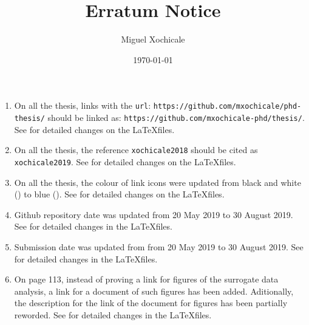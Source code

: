 \documentclass[11pt]{article}
\title{Erratum Notice}
\author{Miguel Xochicale}
\date{\today}
\newcommand{\codeicon}{{\color{linkcolor}\faFileCodeO}}
\newcommand{\codecolorlink}[1]{\href{#1}{\codeicon}}
\newcommand{\codeiconbw}{{\color{linkbw}\faFileCodeO}}
\newcommand{\codebwlink}[1]{\href{#1}{\codeiconbw}}
\begin{document}
\maketitle

\begin{enumerate}
\item On all the thesis, links with the \texttt{url}:   
\texttt{https://github.com/mxochicale/phd-thesis/}
should be linked as: \texttt{https://github.com/mxochicale-phd/thesis/}.
See \cite{xochicale2019-links} for detailed changes on the \LaTeX \space files.


\item On all the thesis, the reference \texttt{xochicale2018} should be cited as
\texttt{xochicale2019}.
See \cite{xochicale2019-links} for detailed changes on the \LaTeX \space files.


\item On all the thesis, the colour of link icons were updated from black and white 
(\texttt{\codebwlink{https://github.com/mxochicale-phd/thesis/}}) to 
blue (\texttt{\codecolorlink{https://github.com/mxochicale-phd/thesis/}}).
See \cite{xochicale2019-links} for detailed changes on the \LaTeX \space files.


\item Github repository date was updated from 20 May 2019 to 30 August 2019.
See \cite{xochicale2019-links} for detailed changes in the \LaTeX \space files.


\item Submission date was updated from from 20 May 2019 to 30 August 2019.
See \cite{xochicale2019-links} for detailed changes in the \LaTeX \space files.


\item On page 113, instead of proving a link for figures of the surrogate 
data analysis, a link for a document of such figures has been added. Aditionally, 
the description for the link of the document for figures has been partially reworded. 
See \cite{xochicale2019-surrogate} for detailed changes in the \LaTeX files.

\end{enumerate}






\end{document}
